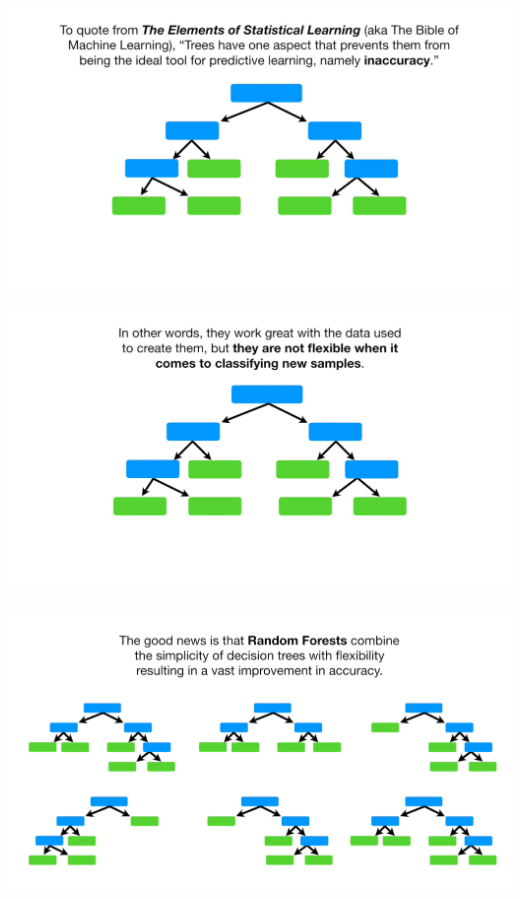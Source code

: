 \documentclass[
  ignorenonframetext,
]{beamer}
\begin{document}
\begin{frame}{}
\protect\hypertarget{section-5}{}
\includegraphics{images/r6.png}
\end{frame}

\begin{frame}{}
\protect\hypertarget{section-6}{}
\includegraphics{images/r7.png}
\end{frame}

\begin{frame}{}
\protect\hypertarget{section-7}{}
\includegraphics{images/r8.png}
\end{frame}
\end{document}
